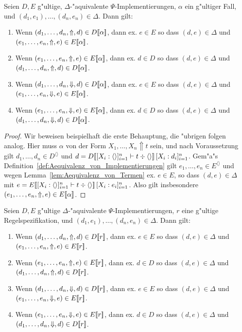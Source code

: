 \documentclass[%
  12pt,%
  a4paper,%
]{article}
\newcommand{\Tj}[3]{{#1}\vdash{#2}\div{#3}}
\begin{document}
\begin{lemma} \label{lem:Aequivalenz_von_Faellen}
  Seien $D, E$ g"ultige, $\Delta$-"aquivalente $\Psi$-Implementierungen, $\alpha$ ein
  g"ultiger Fall, und $(d_1,e_1),\ldots,(d_n,e_n) \in \Delta$. Dann gilt:
  \begin{enumerate}
  \item Wenn $(d_1,\ldots,d_n,\Uparrow,d) \in D[\![\alpha]\!]$, dann ex. $e \in E$ so dass
    $(d,e) \in \Delta$ und $(e_1,\ldots,e_n,\Uparrow,e) \in E[\![\alpha]\!]$.
  \item Wenn $(e_1,\ldots,e_n,\Uparrow,e) \in E[\![\alpha]\!]$, dann ex. $d \in D$ so dass
    $(d,e) \in \Delta$ und $(d_1,\ldots,d_n,\Uparrow,d) \in D[\![\alpha]\!]$.
  \item Wenn $(d_1,\ldots,d_n,\Downarrow,d) \in D[\![\alpha]\!]$, dann ex. $e \in E$ so dass
    $(d,e) \in \Delta$ und $(e_1,\ldots,e_n,\Downarrow,e) \in E[\![\alpha]\!]$.
  \item Wenn $(e_1,\ldots,e_n,\Downarrow,e) \in E[\![\alpha]\!]$, dann ex. $d \in D$ so dass
    $(d,e) \in \Delta$ und $(d_1,\ldots,d_n,\Downarrow,d) \in D[\![\alpha]\!]$.
  \end{enumerate}
\end{lemma}

\begin{proof}
  Wir beweisen beispielhaft die erste Behauptung, die "ubrigen folgen analog.
  Hier muss $\alpha$ von der Form $X_1,\ldots,X_n \Uparrow t$ sein, und nach Voraussetzung
  gilt $d_1,\ldots,d_n \in D^{\langle \rangle}$ und
  $d = D\sem{\Tj{[X_i:\langle\rangle]_{i=1}^n}{t}{\langle \rangle}}\,[X_i:d_i]_{i=1}^n$.
  Gem"a"s Definition~\ref{def:Aequivalenz_von_Implementierungen} gilt $e_1,\ldots,e_n \in E^{\langle \rangle}$
  und wegen Lemma~\ref{lem:Aequivalenz_von_Termen} ex. $e \in E$, so dass
  $(d,e) \in \Delta$ mit $e = E\sem{\Tj{[X_i:\langle\rangle]_{i=1}^n}{t}{\langle \rangle}}\,[X_i:e_i]_{i=1}^n$.
  Also gilt insbesondere $(e_1,\ldots,e_n,\Uparrow,e) \in E[\![\alpha]\!]$.
\end{proof}

\begin{lemma} \label{lem:Aqeuivalenz_von_Regeln}
  Seien $D,E$ g"ultige $\Delta$-"aquivalente $\Psi$-Implementierungen, $r$ eine
  g"ultige Regelspezifikation, und $(d_1,e_1),\ldots,(d_n,e_n) \in \Delta$. Dann gilt:
  \begin{enumerate}
  \item Wenn $(d_1,\ldots,d_n,\Uparrow,d) \in D[\![r]\!]$, dann ex. $e \in E$ so dass
    $(d,e) \in \Delta$ und $(e_1,\ldots,e_n,\Uparrow,e) \in E[\![r]\!]$.
  \item Wenn $(e_1,\ldots,e_n,\Uparrow,e) \in E[\![r]\!]$, dann ex. $d \in D$ so dass
    $(d,e) \in \Delta$ und $(d_1,\ldots,d_n,\Uparrow,d) \in D[\![r]\!]$.
  \item Wenn $(d_1,\ldots,d_n,\Downarrow,d) \in D[\![r]\!]$, dann ex. $e \in E$ so dass
    $(d,e) \in \Delta$ und $(e_1,\ldots,e_n,\Downarrow,e) \in E[\![r]\!]$.
  \item Wenn $(e_1,\ldots,e_n,\Downarrow,e) \in E[\![r]\!]$, dann ex. $d \in D$ so dass
    $(d,e) \in \Delta$ und $(d_1,\ldots,d_n,\Downarrow,d) \in D[\![r]\!]$.
  \end{enumerate}
\end{lemma}
\end{document}
